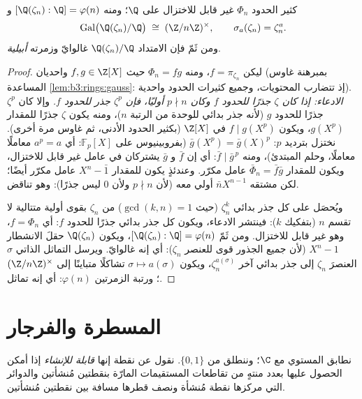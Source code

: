\begin{theorem}\label{thm:b3:galois:cyclotomicirred}
كثير الحدود $\Phi_n$ غير قابل للاختزال على $\Q$؛ ومنه $[\Q(\zeta_n) : \Q] =
\varphi(n)$ و
\[
\operatorname{Gal}\bigl(\Q(\zeta_n)/\Q\bigr) \;\cong\;
(\Z/n\Z)^\times,
\qquad \sigma_a(\zeta_n) = \zeta_n^a .
\]
ومن ثَمّ فإن الامتداد $\Q(\zeta_n)/\Q$ غالوايّ وزمرته
\emph{أبيلية}.
\end{theorem}

\begin{proof}
ليكن $f = \pi_{\zeta_n}$، ومنه $\Phi_n = fg$ حيث $f, g \in \Z[X]$ واحديان
(بمبرهنة غاوس المساعدة \cref{lem:b3:rings:gauss}: إذ تتضارب المحتويات، وجميع
كثيرات الحدود واحدية). \emph{الادعاء: إذا كان $\zeta$ جذرًا
للحدود $f$ وكان $p \nmid n$ أوليًا، فإن $\zeta^p$ جذر للحدود $f$.} وإلا
كان $\zeta^p$ جذرًا للحدود $g$ (لأنه جذر بدائي للوحدة من الرتبة $n$)،
ومنه يكون $\zeta$ جذرًا للمقدار $g(X^p)$، ويكون $f
\mid g(X^p)$ في $\Z[X]$
(بكثير الحدود الأدنى، ثم غاوس مرة أخرى). نختزل بترديد $p$:
$\bar g(X^p) = \bar g(X)^p$ (بفروبينيوس على $\mathbb F_p[X]$: أي $a^p = a$ معاملًا
معاملًا، وحلم المبتدئ)، ومنه $\bar f \mid \bar g^{\,p}$: أي إن $\bar f$ و $\bar g$
يشتركان في عامل غير قابل للاختزال، ويكون للمقدار $\bar\Phi_n = \bar f\bar g$ عامل مكرّر.
وعندئذٍ يكون للمقدار $X^n - \bar 1$ عامل مكرّر أيضًا؛ لكن مشتقه
$\bar nX^{n-1}$ أولي معه (لأن $p \nmid n$ ولأن $0$ ليس جذرًا):
وهو تناقض.

ويُحصَل على كل جذر بدائي $\zeta_n^k$ (حيث $\gcd(k, n) = 1$) من
$\zeta_n$ بقوى أولية متتالية لا تقسم $n$ (بتفكيك $k$): فينتشر
الادعاء، ويكون كل جذر بدائي جذرًا للحدود $f$: أي $f = \Phi_n$، وهو
غير قابل للاختزال. ومن ثَمّ $[\Q(\zeta_n):\Q] = \varphi(n)$، ويكون $\Q(\zeta_n)$ حقلَ
الانشطار  $X^n - 1$ (لأن جميع الجذور
قوى للعنصر $\zeta_n$): أي إنه غالوايّ. ويرسل التماثل الذاتي $\sigma$
العنصرَ $\zeta_n$ إلى جذر بدائي آخر $\zeta_n^{a(\sigma)}$، ويكون $\sigma
\mapsto a(\sigma)$
تشاكلًا متباينًا إلى $(\Z/n\Z)^\times$؛ ورتبة الزمرتين $\varphi(n)$: أي
إنه تماثل.
\end{proof}

\section{المسطرة والفرجار}

\begin{definition}\label{def:b3:galois:constructible}
نطابق المستوي مع $\C$؛ وننطلق من $\{0, 1\}$. نقول عن نقطة إنها
\emph{قابلة للإنشاء} إذا أمكن الحصول
عليها بعدد منتهٍ من تقاطعات المستقيمات المارّة بنقطتين مُنشأتين
والدوائر التي مركزها نقطة مُنشأة ونصف قطرها مسافة بين نقطتين
مُنشأتين.
\end{definition}

